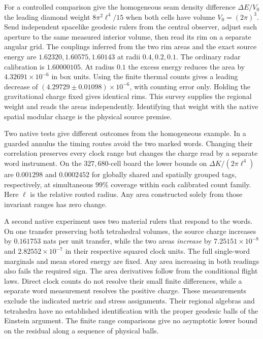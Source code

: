 \documentclass[11pt]{article}
\begin{document}
For a controlled comparison give the homogeneous seam density
difference $\Delta E/V_0$ the leading diamond weight
$8\pi^2\ell^4/15$ when both cells have volume $V_0=(2\pi)^3$.
Send independent spacelike geodesic rulers from the central observer,
adjust each aperture to the same measured interior volume, then read
its rim on a separate angular grid. The couplings inferred from the two
rim areas and the exact source energy are $1.62320,1.60575,1.60143$
at radii $0.4,0.2,0.1$. The ordinary radar calibration is $1.60000105$.
At radius $0.1$ the excess energy reduces the area by
$4.32691\times10^{-6}$ in box units. Using the finite thermal counts
gives a leading decrease of $(4.29729\pm0.01098)\times10^{-6}$,
with counting error only. Holding the gravitational charge fixed gives
identical rims. This survey supplies the regional weight and reads
the areas independently. Identifying that weight with the native
spatial modular charge is the physical source premise.

Two native tests give different outcomes from the homogeneous example.
In a guarded annulus the timing routes avoid the two marked words.
Changing their correlation preserves every clock range but changes the
charge read by a separate word instrument. On the $327{,}680$-cell board
the lower bounds on $\Delta K/(2\pi\ell^4)$ are $0.001298$ and
$0.0002452$ for globally shared and spatially grouped tags, respectively,
at simultaneous $99\%$ coverage within each calibrated count family.
Here $\ell$ is the relative routed radius. Any area constructed solely
from those invariant ranges has zero change.

A second native experiment uses two material rulers that respond to the
words. On one transfer preserving both tetrahedral volumes, the source
charge increases by $0.161753$ nats per unit transfer, while the two
areas \emph{increase} by $7.25151\times10^{-8}$ and
$2.82552\times10^{-7}$ in their respective squared clock units.
The full single-word marginals and mean stored energy are fixed.
Any area increasing in both readings also fails the required sign.
The area derivatives follow from the conditional flight laws. Direct
clock counts do not resolve their small finite differences, while a
separate word measurement resolves the positive charge. These
measurements exclude the indicated metric and stress assignments.
Their regional algebras and tetrahedra have no established
identification with the proper geodesic balls of the Einstein argument.
The finite range comparisons give no asymptotic lower bound on the residual
along a sequence of physical balls.
\end{document}
